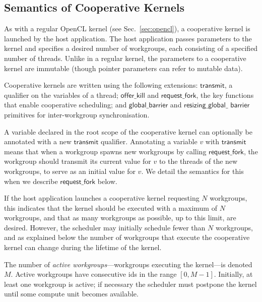 \documentclass[parskip=half,sigconf,review, anonymous=true, acmcopyrightmode=none]{acmart}
\newcommand{\mysec}{Sec.~}
\newcommand{\transmit}{\mathsf{transmit}}
\newcommand{\offerfork}{\mathsf{request\_fork}}
\newcommand{\offerkill}{\mathsf{offer\_kill}}
\newcommand{\globalbarrier}{\mathsf{global\_barrier}}
\newcommand{\resizingglobalbarrier}{\mathsf{resizing\_global\_barrier}}
\begin{document}
\subsection{Semantics of Cooperative Kernels}\label{sec:semantics}

As with a regular OpenCL kernel (see \mysec\ref{sec:opencl}), a
cooperative kernel is launched by the host application.  The host
application passes parameters to the kernel and specifies a desired
number of workgroups, each consisting of a specified number of
threads.  Unlike in a regular kernel, the parameters to a cooperative kernel are immutable (though pointer
parameters can refer to mutable data).

Cooperative kernels are written using the following 
extensions: $\transmit$, a qualifier on the variables of a
thread; $\offerkill$ and $\offerfork$, the key functions that enable
cooperative scheduling; and $\globalbarrier$ and $\mathsf{resizing\_global\_}$ $\mathsf{barrier}$
primitives for inter-workgroup synchronisation.

%
A variable declared in the root scope of the cooperative kernel can
optionally be annotated with a new $\transmit$ qualifier.  Annotating
a variable $v$ with $\transmit$ means that when a workgroup spawns new
workgroups by calling $\offerfork$, the workgroup should transmit its
current value for $v$ to the threads of the new workgroups, to serve
as an initial value for $v$.  We detail the semantics for this when we
describe $\offerfork$ below.

%
If the host application launches a cooperative kernel requesting $N$
workgroups, this indicates that the kernel should be executed with a
maximum of $N$ workgroups, and that as many workgroups as possible, up
to this limit, are desired.  However, the scheduler may initially
schedule fewer than $N$ workgroups, and as explained below the number
of workgroups that execute the cooperative kernel can change during
the lifetime of the kernel.

The number of \emph{active workgroups}---workgroups executing the
kernel---is denoted $M$.  Active workgroups
have consecutive ids in the range $[0, M-1]$.
Initially, at least one workgroup is active;
if necessary the scheduler must postpone the kernel until
some compute unit becomes available.  
\end{document}
